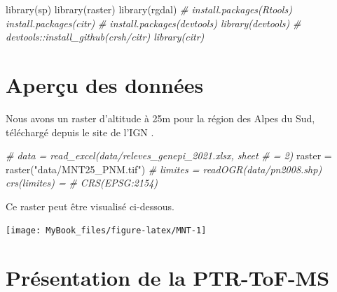 \documentclass[
  12pt,
  american,
  a4paper,
  extrafontsizes,onecolumn,openright
  ]{memoir}
\newenvironment{Shaded}{\begin{snugshade}}{\end{snugshade}}
\newcommand{\CommentTok}[1]{\textcolor[rgb]{0.56,0.35,0.01}{\textit{#1}}}
\newcommand{\FunctionTok}[1]{\textcolor[rgb]{0.00,0.00,0.00}{#1}}
\newcommand{\NormalTok}[1]{#1}
\newcommand{\OtherTok}[1]{\textcolor[rgb]{0.56,0.35,0.01}{#1}}
\newcommand{\StringTok}[1]{\textcolor[rgb]{0.31,0.60,0.02}{#1}}
\begin{document}
\normalsize

\scriptsize

\begin{Shaded}
\begin{Highlighting}[]
\FunctionTok{library}\NormalTok{(sp)}
\FunctionTok{library}\NormalTok{(raster)}
\FunctionTok{library}\NormalTok{(rgdal)}
\CommentTok{\# install.packages(\textquotesingle{}Rtools\textquotesingle{}) install.packages(\textquotesingle{}citr\textquotesingle{})}
\CommentTok{\# install.packages(\textquotesingle{}devtools\textquotesingle{}) library(devtools)}
\CommentTok{\# devtools::install\_github(\textquotesingle{}crsh/citr\textquotesingle{}) library(citr)}
\end{Highlighting}
\end{Shaded}

\normalsize

\hypertarget{aperuxe7u-des-donnuxe9es}{%
\chapter{Aperçu des données}\label{aperuxe7u-des-donnuxe9es}}

Nous avons un raster d'altitude à 25m pour la région des Alpes du Sud, téléchargé depuis le site de l'IGN \autocite{ign_rge_2013}.

\scriptsize

\begin{Shaded}
\begin{Highlighting}[]
\CommentTok{\# data = read\_excel(\textquotesingle{}data/releves\_genepi\_2021.xlsx\textquotesingle{}, sheet}
\CommentTok{\# = 2)}
\NormalTok{raster }\OtherTok{=} \FunctionTok{raster}\NormalTok{(}\StringTok{"data/MNT25\_PNM.tif"}\NormalTok{)}
\CommentTok{\# limites = readOGR(\textquotesingle{}data/pn2008.shp\textquotesingle{}) crs(limites) =}
\CommentTok{\# CRS(\textquotesingle{}EPSG:2154\textquotesingle{})}
\end{Highlighting}
\end{Shaded}

\normalsize

Ce raster peut être visualisé ci-dessous.

\scriptsize

\begin{center}\texttt{[image: MyBook\_files/figure-latex/MNT-1]} \end{center}

\normalsize

\hypertarget{pruxe9sentation-de-la-ptr-tof-ms}{%
\chapter{Présentation de la PTR-ToF-MS}\label{pruxe9sentation-de-la-ptr-tof-ms}}
\end{document}
